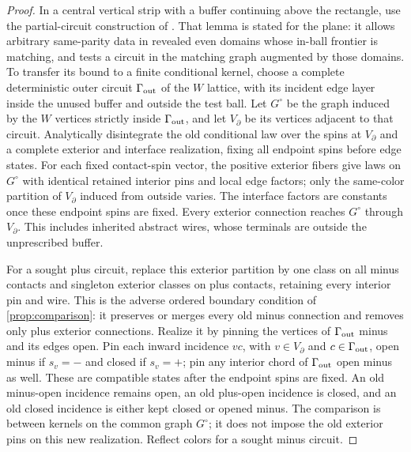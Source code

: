 \begin{proof}
In a central vertical strip with a buffer continuing above the
rectangle, use the partial-circuit construction of
\cite[Lemma~19.4 and the proof of Lemma~19.1]{DKLM2026}. That lemma
is stated for the plane: it allows arbitrary same-parity data in
revealed even domains whose in-ball frontier is matching, and tests
a circuit in the matching graph augmented by those domains.
To transfer its bound to a finite conditional kernel, choose a
complete deterministic outer circuit $\Gamma_{\rm out}$ of the $W$
lattice, with its incident edge layer inside the unused buffer and
outside the test ball. Let $G^\circ$ be the graph induced by the $W$
vertices strictly inside $\Gamma_{\rm out}$, and let $V_\partial$ be
its vertices adjacent to that circuit. Analytically disintegrate the
old conditional law over the spins at $V_\partial$ and a complete
exterior and interface realization, fixing all endpoint spins before
edge states. For each fixed contact-spin vector, the positive exterior
fibers give laws on $G^\circ$ with identical retained interior pins
and local edge factors; only the same-color
partition of $V_\partial$ induced from outside varies. The interface
factors are constants once these endpoint spins are fixed. Every
exterior connection reaches $G^\circ$ through $V_\partial$. This
includes inherited abstract wires, whose terminals are outside the
unprescribed buffer.

For a sought plus circuit, replace this exterior partition by one
class on all minus contacts and singleton exterior classes on plus
contacts, retaining every interior pin and wire. This is the adverse
ordered boundary condition of \cref{prop:comparison}: it preserves or
merges every old minus connection and removes only plus exterior
connections. Realize it by pinning the vertices of $\Gamma_{\rm out}$
minus and its edges open. Pin each inward incidence $vc$, with
$v\in V_\partial$ and $c\in\Gamma_{\rm out}$, open minus if $s_v=-$
and closed if $s_v=+$; pin any interior chord of $\Gamma_{\rm out}$
open minus as well. These are compatible states after the endpoint
spins are fixed. An old minus-open incidence remains open, an old
plus-open incidence is closed, and an old closed incidence is either
kept closed or opened minus. The comparison is between kernels on
the common graph $G^\circ$; it does not impose the old exterior pins
on this new realization. Reflect colors for a sought minus circuit.


\end{proof}
